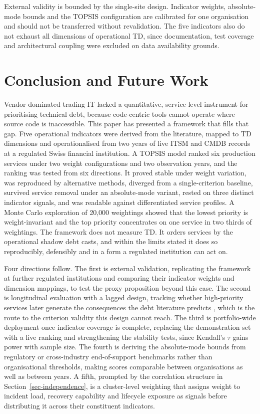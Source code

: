 \documentclass[
  journal,
]{IEEEtran}%
\begin{document}
External validity is bounded by the single-site design. Indicator
weights, absolute-mode bounds and the TOPSIS configuration are
calibrated for one organisation and should not be transferred without
revalidation. The five indicators also do not exhaust all dimensions of
operational TD, since documentation, test coverage and architectural
coupling were excluded on data availability grounds.

\section{Conclusion and Future Work}\label{sec-conclusion}

Vendor-dominated trading IT lacked a quantitative, service-level
instrument for prioritising technical debt, because code-centric tools
cannot operate where source code is inaccessible. This paper has
presented a framework that fills that gap. Five operational indicators
were derived from the literature, mapped to TD dimensions and
operationalised from two years of live ITSM and CMDB records at a
regulated Swiss financial institution. A TOPSIS model ranked six
production services under two weight configurations and two observation
years, and the ranking was tested from six directions. It proved stable
under weight variation, was reproduced by alternative methods, diverged
from a single-criterion baseline, survived service removal under an
absolute-mode variant, rested on three distinct indicator signals, and
was readable against differentiated service profiles. A Monte Carlo
exploration of 20,000 weightings showed that the lowest priority is
weight-invariant and the top priority concentrates on one service in two
thirds of weightings. The framework does not measure TD. It orders
services by the operational shadow debt casts, and within the limits
stated it does so reproducibly, defensibly and in a form a regulated
institution can act on.

Four directions follow. The first is external validation, replicating
the framework at further regulated institutions and comparing their
indicator weights and dimension mappings, to test the proxy proposition
beyond this case. The second is longitudinal evaluation with a lagged
design, tracking whether high-priority services later generate the
consequences the debt literature predicts
, which is the route
to the criterion validity this design cannot reach. The third is
portfolio-wide deployment once indicator coverage is complete, replacing
the demonstration set with a live ranking and strengthening the
stability tests, since Kendall's \(\tau\) gains power with sample size.
The fourth is deriving the absolute-mode bounds from regulatory or
cross-industry end-of-support benchmarks rather than organisational
thresholds, making scores comparable between organisations as well as
between years. A fifth, prompted by the correlation structure in
Section~\ref{sec-independence}, is a cluster-level weighting that
assigns weight to incident load, recovery capability and lifecycle
exposure as signals before distributing it across their constituent
indicators.
\end{document}
